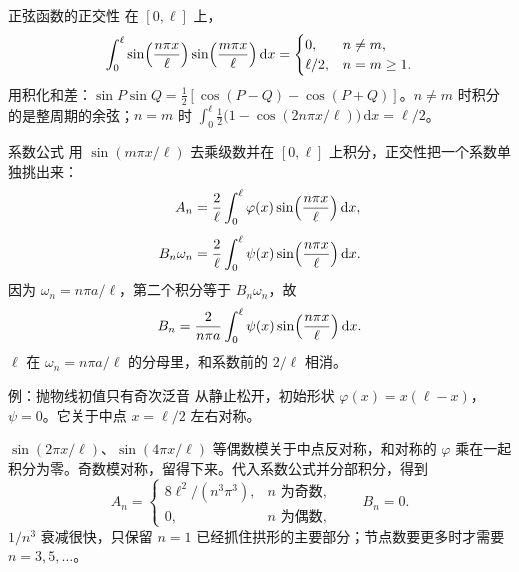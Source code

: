 \documentclass[fontset=windows, chinese, 10pt, xcolor=dvipsnames]{beamer}
\begin{document}
\begin{frame}{正弦函数的正交性}
  在 $[0,\ell]$ 上，
  \begin{equation*}
    \int_0^{\ell}
      \sin\Bigl(\frac{n\pi x}{\ell}\Bigr)
      \sin\Bigl(\frac{m\pi x}{\ell}\Bigr)\,\mathrm{d}x
    =
    \begin{cases}
      0, & n\neq m,\\
      \ell/2, & n=m\geq 1.
    \end{cases}
  \end{equation*}
  用积化和差：$\sin P\sin Q=\tfrac12[\cos(P-Q)-\cos(P+Q)]$。$n\neq m$ 时积分的是整周期的余弦；$n=m$ 时 $\int_0^\ell \tfrac12\bigl(1-\cos(2n\pi x/\ell)\bigr)\,\mathrm{d}x=\ell/2$。
\end{frame}

\begin{frame}{系数公式}
  用 $\sin(m\pi x/\ell)$ 去乘级数并在 $[0,\ell]$ 上积分，正交性把一个系数单独挑出来：
  \begin{align*}
    A_n&=\frac{2}{\ell}\int_0^{\ell}
      \varphi(x)\sin\Bigl(\frac{n\pi x}{\ell}\Bigr)\,\mathrm{d}x,\\[4pt]
    B_n\omega_n&=\frac{2}{\ell}\int_0^{\ell}
      \psi(x)\sin\Bigl(\frac{n\pi x}{\ell}\Bigr)\,\mathrm{d}x.
  \end{align*}
  因为 $\omega_n=n\pi a/\ell$，第二个积分等于 $B_n\omega_n$，故
  \begin{equation*}
    B_n=\frac{2}{n\pi a}\int_0^{\ell}
      \psi(x)\sin\Bigl(\frac{n\pi x}{\ell}\Bigr)\,\mathrm{d}x.
  \end{equation*}
  $\ell$ 在 $\omega_n=n\pi a/\ell$ 的分母里，和系数前的 $2/\ell$ 相消。
\end{frame}

\begin{frame}{例：抛物线初值只有奇次泛音}
  从静止松开，初始形状 $\varphi(x)=x(\ell-x)$，$\psi=0$。它关于中点 $x=\ell/2$ 左右对称。
  \vspace{0.3em}

  $\sin(2\pi x/\ell)$、$\sin(4\pi x/\ell)$ 等偶数模关于中点反对称，和对称的 $\varphi$ 乘在一起积分为零。奇数模对称，留得下来。代入系数公式并分部积分，得到
  \begin{equation*}
    A_n=
    \begin{cases}
      8\ell^{2}/(n^{3}\pi^{3}), & n\text{ 为奇数},\\
      0, & n\text{ 为偶数},
    \end{cases}
    \qquad B_n=0.
  \end{equation*}
  $1/n^3$ 衰减很快，只保留 $n=1$ 已经抓住拱形的主要部分；节点数要更多时才需要 $n=3,5,\ldots$。
\end{frame}
\end{document}
